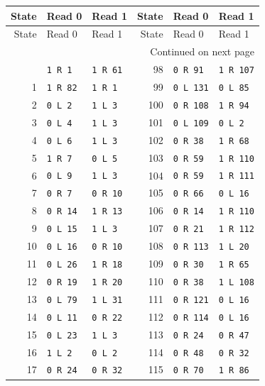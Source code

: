 \small
\begin{longtable}{rll@{\qquad}rll}
\toprule
State & Read 0 & Read 1 & State & Read 0 & Read 1\\
\midrule
\endfirsthead
\toprule
State & Read 0 & Read 1 & State & Read 0 & Read 1\\
\midrule
\endhead
\midrule
\multicolumn{6}{r}{Continued on next page}\\
\endfoot
\bottomrule
\endlastfoot
0 & \texttt{1 R 1} & \texttt{1 R 61} & 98 & \texttt{0 R 91} & \texttt{1 R 107}\\
1 & \texttt{1 R 82} & \texttt{1 R 1} & 99 & \texttt{0 L 131} & \texttt{0 L 85}\\
2 & \texttt{0 L 2} & \texttt{1 L 3} & 100 & \texttt{0 R 108} & \texttt{1 R 94}\\
3 & \texttt{0 L 4} & \texttt{1 L 3} & 101 & \texttt{0 L 109} & \texttt{0 L 2}\\
4 & \texttt{0 L 6} & \texttt{1 L 3} & 102 & \texttt{0 R 38} & \texttt{1 R 68}\\
5 & \texttt{1 R 7} & \texttt{0 L 5} & 103 & \texttt{0 R 59} & \texttt{1 R 110}\\
6 & \texttt{0 L 9} & \texttt{1 L 3} & 104 & \texttt{0 R 59} & \texttt{1 R 111}\\
7 & \texttt{0 R 7} & \texttt{0 R 10} & 105 & \texttt{0 R 66} & \texttt{0 L 16}\\
8 & \texttt{0 R 14} & \texttt{1 R 13} & 106 & \texttt{0 R 14} & \texttt{1 R 110}\\
9 & \texttt{0 L 15} & \texttt{1 L 3} & 107 & \texttt{0 R 21} & \texttt{1 R 112}\\
10 & \texttt{0 L 16} & \texttt{0 R 10} & 108 & \texttt{0 R 113} & \texttt{1 L 20}\\
11 & \texttt{0 L 26} & \texttt{1 R 18} & 109 & \texttt{0 R 30} & \texttt{1 R 65}\\
12 & \texttt{0 R 19} & \texttt{1 R 20} & 110 & \texttt{0 R 38} & \texttt{1 L 108}\\
13 & \texttt{0 L 79} & \texttt{1 L 31} & 111 & \texttt{0 R 121} & \texttt{0 L 16}\\
14 & \texttt{0 L 11} & \texttt{0 R 22} & 112 & \texttt{0 R 114} & \texttt{0 L 16}\\
15 & \texttt{0 L 23} & \texttt{1 L 3} & 113 & \texttt{0 R 24} & \texttt{0 R 47}\\
16 & \texttt{1 L 2} & \texttt{0 L 2} & 114 & \texttt{0 R 48} & \texttt{0 R 32}\\
17 & \texttt{0 R 24} & \texttt{0 R 32} & 115 & \texttt{0 R 70} & \texttt{1 R 86}\\

\end{longtable}
